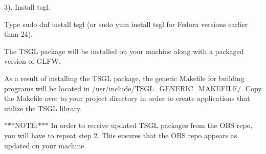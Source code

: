 3). Install tsgl.


\begin{DoxyItemize}
\item Type {\ttfamily sudo dnf install tsgl} (or {\ttfamily sudo yum install tsgl} for Fedora versions earlier than 24).
\end{DoxyItemize}

The T\-S\-G\-L package will be installed on your machine along with a packaged version of G\-L\-F\-W.

As a result of installing the T\-S\-G\-L package, the generic Makefile for building programs will be located in {\ttfamily /usr/include/\-T\-S\-G\-L\-\_\-\-G\-E\-N\-E\-R\-I\-C\-\_\-\-M\-A\-K\-E\-F\-I\-L\-E/}. Copy the Makefile over to your project directory in order to create applications that utilize the T\-S\-G\-L library.

$\ast$$\ast$$\ast$\-N\-O\-T\-E\-:$\ast$$\ast$$\ast$ In order to receive updated T\-S\-G\-L packages from the O\-B\-S repo, you will have to repeat step 2. This ensures that the O\-B\-S repo appears as updated on your machine. 